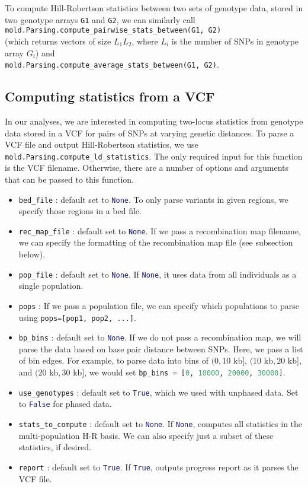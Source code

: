 \documentclass[10pt]{article}
\makeatletter
\newcommand{\py}[1]{\lstinline[breaklines=true,language=Python, showstringspaces=False]@#1@}
\makeatother
\begin{document}
To compute Hill-Robertson statistics between two sets of genotype data, stored in two genotype arrays \py{G1} and \py{G2}, we can similarly call\\
\py{mold.Parsing.compute_pairwise_stats_between(G1, G2)}\\
(which returns vectors of size $L_1L_2$, where $L_i$ is the number of SNPs in genotype array $G_i$) and \\\py{mold.Parsing.compute_average_stats_between(G1, G2)}.


\subsection{Computing statistics from a VCF}

In our analyses, we are interested in computing two-locus statistics from genotype data stored in a VCF for pairs of SNPs at varying genetic distances.
To parse a VCF file and output Hill-Robertson statistics, we use \py{mold.Parsing.compute_ld_statistics}.
The only required input for this function is the VCF filename.
Otherwise, there are a number of options and arguments that can be passed to this function.
\begin{itemize}
\item \py{bed_file} : default set to \py{None}. To only parse variants in given regions, we specify those regions in a bed file.
\item \py{rec_map_file} : default set to \py{None}. If we pass a recombination map filename, we can specify the formatting of the recombination map file (see subsection below).
\item \py{pop_file} : default set to \py{None}. If \py{None}, it uses data from all individuals as a single population. 
\item \py{pops} : If we pass a population file, we can specify which populations to parse using \py{pops=[pop1, pop2, ...]}.
\item \py{bp_bins} : default set to \py{None}. If we do not pass a recombination map, we will parse the data based on base pair distance between SNPs. Here, we pass a list of bin edges. For example, to parse data into bins of $(0,10\text{ kb}]$, $(10\text{ kb},20\text{ kb}]$, and $(20\text{ kb},30\text{ kb}]$, we would set \py{bp_bins = [0, 10000, 20000, 30000]}.
\item \py{use_genotypes} : default set to \py{True}, which we used with unphased data. Set to \py{False} for phased data.
\item \py{stats_to_compute} : default set to \py{None}. If \py{None}, computes all statistics in the multi-population H-R basis. We can also specify just a subset of these statistics, if desired.
\item \py{report} : default set to \py{True}. If \py{True}, outputs progress report as it parses the VCF file.
\end{itemize}
\end{document}
